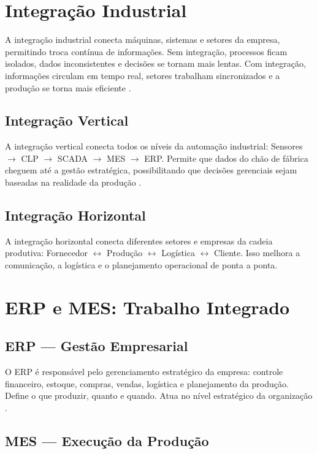 \documentclass[12pt,a4paper,oneside]{article}
\begin{document}
\section{Integração Industrial}

A integração industrial conecta máquinas, sistemas e setores da empresa, permitindo troca contínua de informações. Sem integração, processos ficam isolados, dados inconsistentes e decisões se tornam mais lentas. Com integração, informações circulam em tempo real, setores trabalham sincronizados e a produção se torna mais eficiente \cite{caiçara2015}.

\subsection{Integração Vertical}

A integração vertical conecta todos os níveis da automação industrial: Sensores $\rightarrow$ CLP $\rightarrow$ SCADA $\rightarrow$ MES $\rightarrow$ ERP. Permite que dados do chão de fábrica cheguem até a gestão estratégica, possibilitando que decisões gerenciais sejam baseadas na realidade da produção \cite{moraes2007}.

\subsection{Integração Horizontal}

A integração horizontal conecta diferentes setores e empresas da cadeia produtiva: Fornecedor $\leftrightarrow$ Produção $\leftrightarrow$ Logística $\leftrightarrow$ Cliente. Isso melhora a comunicação, a logística e o planejamento operacional de ponta a ponta.

\section{ERP e MES: Trabalho Integrado}

\subsection{ERP --- Gestão Empresarial}

O ERP é responsável pelo gerenciamento estratégico da empresa: controle financeiro, estoque, compras, vendas, logística e planejamento da produção. Define o que produzir, quanto e quando. Atua no nível estratégico da organização \cite{santos2024}.

\subsection{MES --- Execução da Produção}
\end{document}
